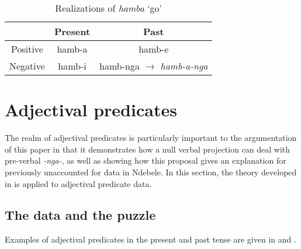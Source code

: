 \documentclass[output=paper]{langsci/langscibook}
\begin{document}
\begin{table}
\caption{Realizations of \textit{hamba} `go'} %
\centering %
\begin{tabular}{|c|c|c|} %
\hline%
 & Present & Past\\ [0.5ex] 
\midrule%
Positive & hamb-a  & hamb-e  \\ %
Negative & hamb-i & hamb-nga $\longrightarrow$ \textit{hamb-a-nga}\\[1ex] %
\midrule%
\end{tabular} 
\label{tab:burkholder:5} 
\end{table} 





\section{Adjectival predicates}\label{sec:burkholder:3}

The realm of adjectival predicates is particularly important to the argumentation of this paper in that it demonstrates how a null verbal projection can deal with pre-verbal \textit{-nga-}, as well as showing how this proposal gives an explanation for previously unaccounted for data in Ndebele. In this section, the theory developed in  is applied to adjectival predicate data.

\subsection{The data and the puzzle}

Examples of adjectival predicates in the present and past tense are given in  and .
\end{document}
